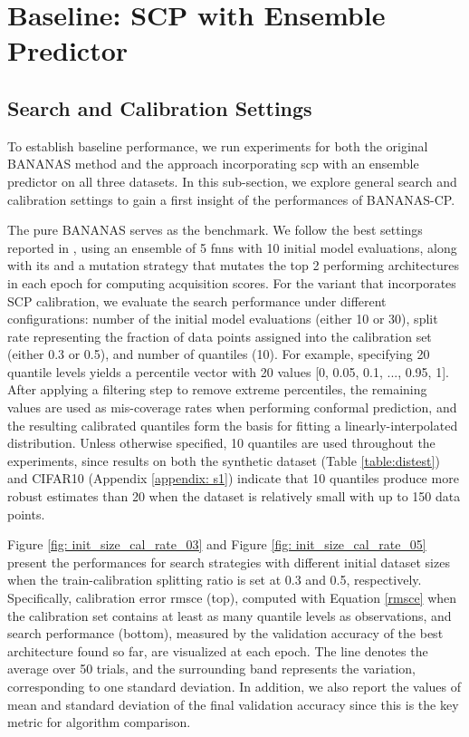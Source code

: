 \documentclass[a4paper,oneside,bibliography=totoc]{scrbook}
\begin{document}
\section{Baseline: SCP with Ensemble Predictor}
\label{sec: baseline}

\subsection{Search and Calibration Settings}
\label{sec: sc_setting}
To establish baseline performance, we run experiments for both the original BANANAS method and the approach incorporating \gls{scp} with an ensemble predictor on all three datasets. In this sub-section, we explore general search and calibration settings to gain a first insight of the performances of BANANAS-CP.

The pure BANANAS serves as the benchmark. We follow the best settings reported in \cite{white2019bananas}, using an ensemble of 5 \gls{fnns} with 10 initial model evaluations, along with \gls{its} and a mutation strategy that mutates the top 2 performing architectures in each epoch for computing acquisition scores. For the variant that incorporates SCP calibration, we evaluate the search performance under different configurations: number of the initial model evaluations (either 10 or 30), split rate representing the fraction of data points assigned into the calibration set (either 0.3 or 0.5), and number of quantiles (10). For example, specifying 20 quantile levels yields a percentile vector with 20 values [0, 0.05, 0.1, ..., 0.95, 1]. After applying a filtering step to remove extreme percentiles, the remaining values are used as mis-coverage rates when performing conformal prediction, and the resulting calibrated quantiles form the basis for fitting a linearly-interpolated distribution. Unless otherwise specified, 10 quantiles are used throughout the experiments, since results on both the synthetic dataset (Table \ref{table:distest}) and CIFAR10 (Appendix \ref{appendix: s1}) indicate that 10 quantiles produce more robust estimates than 20 when the dataset is relatively small with up to 150 data points.

Figure \ref{fig: init_size_cal_rate_03} and Figure \ref{fig: init_size_cal_rate_05} present the performances for search strategies with different initial dataset sizes when the train-calibration splitting ratio is set at 0.3 and 0.5, respectively. Specifically, calibration error \gls{rmsce} (top), computed with Equation \ref{rmsce} when the calibration set contains at least as many quantile levels as observations, and search performance (bottom), measured by the validation accuracy of the best architecture found so far, are visualized at each epoch. The line denotes the average over 50 trials, and the surrounding band represents the variation, corresponding to one standard deviation. In addition, we also report the values of mean and standard deviation of the final validation accuracy since this is the key metric for algorithm comparison.
\end{document}
